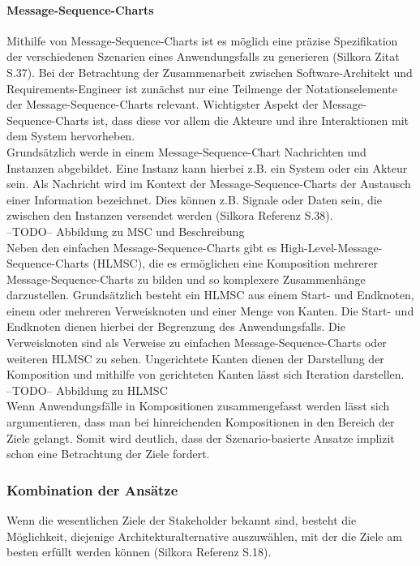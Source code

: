 \paragraph{Message-Sequence-Charts}
Mithilfe von Message-Sequence-Charts ist es möglich eine präzise Spezifikation der verschiedenen Szenarien eines Anwendungsfalls zu generieren (Silkora Zitat S.37). Bei der Betrachtung der Zusammenarbeit zwischen Software-Architekt und Requirements-Engineer ist zunächst nur eine Teilmenge der Notationselemente der Message-Sequence-Charts relevant. Wichtigster Aspekt der Message-Sequence-Charts ist, dass diese vor allem die Akteure und ihre Interaktionen mit dem System hervorheben.\\

Grundsätzlich werde in einem Message-Sequence-Chart Nachrichten und Instanzen abgebildet. Eine Instanz kann hierbei z.B. ein System oder ein Akteur sein. Als Nachricht wird im Kontext der Message-Sequence-Charts der Austausch einer Information bezeichnet. Dies können z.B. Signale oder Daten sein, die zwischen den Instanzen versendet werden (Silkora Referenz S.38). \\

--TODO-- Abbildung zu MSC und Beschreibung\\

Neben den einfachen Message-Sequence-Charts gibt es High-Level-Message-Sequence-Charts (HLMSC), die es ermöglichen eine Komposition mehrerer Message-Sequence-Charts zu bilden und so komplexere Zusammenhänge darzustellen. Grundsätzlich besteht ein HLMSC aus einem Start- und Endknoten, einem oder mehreren Verweisknoten und einer Menge von Kanten. Die Start- und Endknoten dienen hierbei der Begrenzung des Anwendungsfalls.  Die Verweisknoten sind als Verweise zu einfachen Message-Sequence-Charts oder weiteren HLMSC zu sehen. Ungerichtete Kanten dienen der Darstellung der Komposition und mithilfe von gerichteten Kanten lässt sich Iteration darstellen.\\

--TODO-- Abbildung zu HLMSC \\

Wenn Anwendungsfälle in Kompositionen zusammengefasst werden lässt sich argumentieren, dass man bei hinreichenden Kompositionen in den Bereich der Ziele gelangt. Somit wird deutlich, dass der Szenario-basierte Ansatze implizit schon eine Betrachtung der Ziele fordert.\\

\subsubsection{Kombination der Ans\"atze}
Wenn die wesentlichen Ziele der Stakeholder bekannt sind, besteht die M\"oglichkeit, diejenige Architekturalternative auszuw\"ahlen, mit der die Ziele am besten erf\"ullt werden k\"onnen (Silkora Referenz S.18).\\

